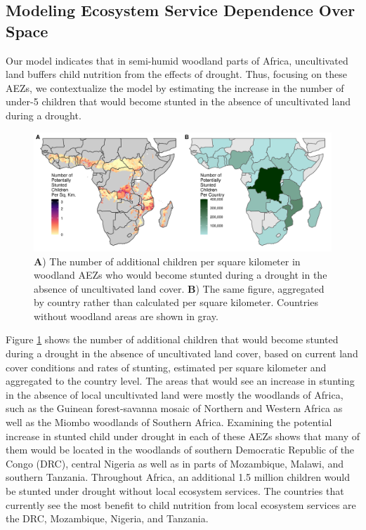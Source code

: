 \documentclass[titlepage]{article}
\begin{document}
\subsection{Modeling Ecosystem Service Dependence Over Space}
Our model indicates that in semi-humid woodland parts of Africa, uncultivated land buffers child nutrition from the effects of drought.  Thus, focusing on these AEZs, we contextualize the model by estimating the increase in the number of under-5 children that would become stunted in the absence of uncultivated land during a drought.

\begin{figure}[h!]
	\begin{center}
		\includegraphics[width=\linewidth]{AfricaEffect.png}
    \caption{\textbf{A}) The number of additional children per square kilometer in woodland AEZs who would become stunted during a drought in the absence of uncultivated land cover.  \textbf{B}) The same figure, aggregated by country rather than calculated per square kilometer.  Countries without woodland areas are shown in gray.}
		\label{fig:AfricaEffect}
	\end{center}
\end{figure}

Figure \ref{fig:AfricaEffect} shows the number of additional children that would become stunted during a drought in the absence of uncultivated land cover, based on current land cover conditions and rates of stunting, estimated per square kilometer and aggregated to the country level.  The areas that would see an increase in stunting in the absence of local uncultivated land were mostly the woodlands of Africa, such as the Guinean forest-savanna mosaic of Northern and Western Africa as well as the Miombo woodlands of Southern Africa. Examining the potential increase in stunted child under drought in each of these AEZs shows that many of them would be located in the woodlands of southern Democratic Republic of the Congo (DRC), central Nigeria as well as in parts of Mozambique, Malawi, and southern Tanzania.  Throughout Africa, an additional 1.5 million children would be stunted under drought without local ecosystem services.  The countries that currently see the most benefit to child nutrition from local ecosystem services are the DRC, Mozambique, Nigeria, and Tanzania.
\end{document}
